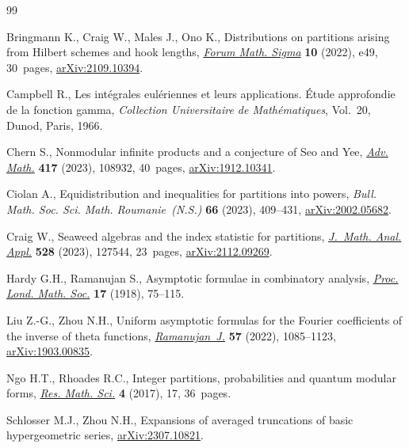 \begin{thebibliography}{99}
\footnotesize\itemsep=0pt

Bringmann K., Craig W., Males J., Ono K., Distributions on partitions arising
 from {H}ilbert schemes and hook lengths, \href{https://doi.org/10.1017/fms.2022.45}{\textit{Forum Math. Sigma}}
 \textbf{10} (2022), e49, 30~pages, \href{https://arxiv.org/abs/2109.10394}{arXiv:2109.10394}.

Campbell R., Les int\'egrales eul\'eriennes et leurs applications. \'{E}tude
 approfondie de la fonction gamma, \textit{Collection Universitaire de
 Math\'ematiques}, Vol.~20, Dunod, Paris, 1966.

Chern S., Nonmodular infinite products and a conjecture of {S}eo and {Y}ee,
 \href{https://doi.org/10.1016/j.aim.2023.108932}{\textit{Adv. Math.}} \textbf{417} (2023), 108932, 40~pages,
 \href{https://arxiv.org/abs/1912.10341}{arXiv:1912.10341}.

Ciolan A., Equidistribution and inequalities for partitions into powers,
 \textit{Bull. Math. Soc. Sci. Math. Roumanie~(N.S.)} \textbf{66} (2023),
 409--431, \href{https://arxiv.org/abs/2002.05682}{arXiv:2002.05682}.

Craig W., Seaweed algebras and the index statistic for partitions,
 \href{https://doi.org/10.1016/j.jmaa.2023.127544}{\textit{J.~Math. Anal. Appl.}} \textbf{528} (2023), 127544, 23~pages,
 \href{https://arxiv.org/abs/2112.09269}{arXiv:2112.09269}.

Hardy G.H., Ramanujan S., Asymptotic formulae in combinatory analysis,
 \href{https://doi.org/10.1112/plms/s2-17.1.75}{\textit{Proc. Lond. Math. Soc.}} \textbf{17} (1918), 75--115.

Liu Z.-G., Zhou N.H., Uniform asymptotic formulas for the {F}ourier coefficients
 of the inverse of theta functions, \href{https://doi.org/10.1007/s11139-021-00409-8}{\textit{Ramanujan~J.}} \textbf{57} (2022),
 1085--1123, \href{https://arxiv.org/abs/1903.00835}{arXiv:1903.00835}.

Ngo H.T., Rhoades R.C., Integer partitions, probabilities and quantum modular
 forms, \href{https://doi.org/10.1186/s40687-017-0102-4}{\textit{Res. Math. Sci.}} \textbf{4} (2017), 17, 36~pages.

Schlosser M.J., Zhou N.H., Expansions of averaged truncations of basic
 hypergeometric series, \href{https://arxiv.org/abs/2307.10821}{arXiv:2307.10821}.


\end{thebibliography}
